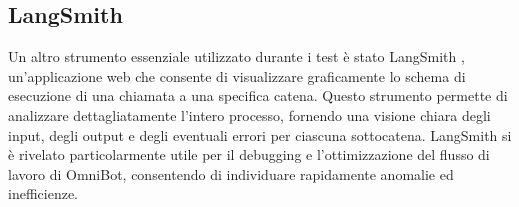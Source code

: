 \subsection{LangSmith}
Un altro strumento essenziale utilizzato durante i test è stato LangSmith \cite{langsmith}, un'applicazione web che consente di visualizzare graficamente lo schema di esecuzione di una chiamata a una specifica catena. Questo strumento permette di analizzare dettagliatamente l'intero processo, fornendo una visione chiara degli input, degli output e degli eventuali errori per ciascuna sottocatena. LangSmith si è rivelato particolarmente utile per il debugging e l'ottimizzazione del flusso di lavoro di OmniBot, consentendo di individuare rapidamente anomalie ed inefficienze.

